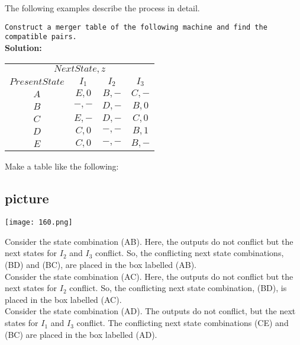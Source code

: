\documentclass[a4]{article}
\begin{document}
The following examples describe the process in detail.\\

\vspace*{0.5cm}

 \hspace*{0.1cm} \texttt{Construct a merger table of the following machine and find the compatible pairs.}\\

\textbf{Solution:}\\
\begin{center}
\begin{tabular}{cccc}
 \hline

 \hline

 \hline

 \hline

\multicolumn{4}{c}{$Next State, z$}\\
 \cline{2-4}
       $Present State$   &    $I_1$      &    $I_2$        &        $I_3$      \\
 \hline
     $A$ & $E, 0$ & $B, -$ & $C, -$ \\
     $B$ & $-, -$ & $D, -$ & $B, 0$ \\
     $C$ & $E, -$ & $D, -$ & $C, 0$ \\
     $D$ & $C, 0$ & $-, -$ & $B, 1$ \\
     $E$ & $C, 0$ & $-, -$ & $B, -$ \\
 \hline

 \hline

 \hline

 \hline
\end{tabular}
\end{center}

\vspace*{0.2cm}

Make a table like the following:\\

\begin{center}
\section{picture}
\texttt{[image: 160.png]}
\end{center}

\hspace*{0.5cm} Consider the state combination (AB). Here, the outputs do not conflict but the next states for $I_2$ and $I_3$
conflict. So, the conflicting next state combinations, (BD) and (BC), are placed in the box labelled (AB).\\
\hspace*{0.5cm} Consider the state combination (AC). Here, the outputs do not conflict but the next states for $I_2$ conflict. So, the conflicting next state combination, (BD), is placed in the box labelled (AC).\\
\hspace*{0.5cm} Consider the state combination (AD). The outputs do not conflict, but the next states for $I_1$ and $I_3$
conflict. The conflicting next state combinations (CE) and (BC) are placed in the box labelled (AD).\\
\end{document}
